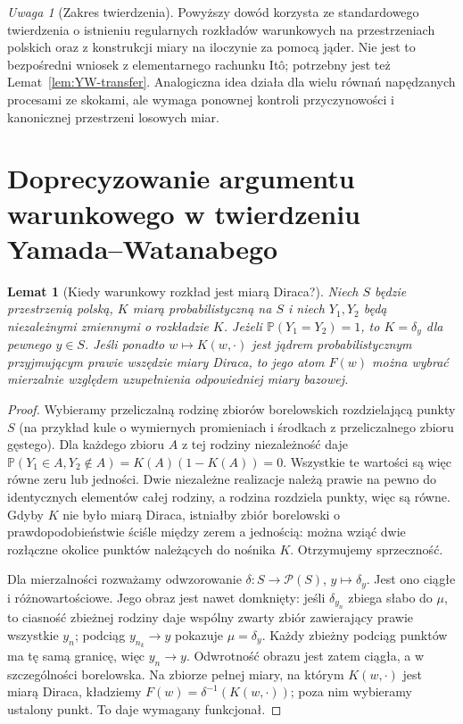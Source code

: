 \documentclass[11pt,a4paper,oneside]{report}
\numberwithin{equation}{chapter}
\theoremstyle{plain}
\newtheorem{lemat}[twierdzenie]{Lemat}
\theoremstyle{definition}
\theoremstyle{remark}
\newtheorem{uwaga}{Uwaga}[chapter]
\newcommand{\Prob}{\mathbb{P}}
\begin{document}
\begin{uwaga}[Zakres twierdzenia]
Powyższy dowód korzysta ze standardowego twierdzenia o
istnieniu regularnych rozkładów warunkowych na przestrzeniach
polskich oraz z konstrukcji miary na iloczynie za pomocą jąder.
Nie jest to bezpośredni wniosek z elementarnego rachunku
Itô; potrzebny jest też Lemat~\ref{lem:YW-transfer}.
Analogiczna idea działa dla wielu równań napędzanych
procesami ze skokami, ale wymaga ponownej kontroli
przyczynowości i kanonicznej przestrzeni losowych miar.
\end{uwaga}


\section{Doprecyzowanie argumentu warunkowego w twierdzeniu Yamada--Watanabego}

\begin{lemat}[Kiedy warunkowy rozkład jest miarą Diraca?]
\label{lem:dirac-audit}
Niech $S$ będzie przestrzenią polską, $K$ miarą
probabilistyczną na $S$ i niech $Y_1,Y_2$ będą
niezależnymi zmiennymi o rozkładzie $K$. Jeżeli
$\Prob(Y_1=Y_2)=1$, to $K=\delta_y$ dla pewnego $y\in S$.
Jeśli ponadto $w\mapsto K(w,\cdot)$ jest jądrem
probabilistycznym przyjmującym prawie wszędzie miary
Diraca, to jego atom $F(w)$ można wybrać mierzalnie
względem uzupełnienia odpowiedniej miary bazowej.
\end{lemat}
\begin{proof}
Wybieramy przeliczalną rodzinę zbiorów borelowskich
rozdzielającą punkty $S$ (na przykład kule o wymiernych
promieniach i środkach z przeliczalnego zbioru gęstego).
Dla każdego zbioru $A$ z tej rodziny niezależność daje
$\Prob(Y_1\in A,Y_2\notin A)=K(A)(1-K(A))=0$.
Wszystkie te wartości są więc równe zeru lub jedności.
Dwie niezależne realizacje należą prawie na pewno do
identycznych elementów całej rodziny, a rodzina rozdziela
punkty, więc są równe. Gdyby $K$ nie było miarą Diraca,
istniałby zbiór borelowski o prawdopodobieństwie ściśle
między zerem a jednością: można wziąć dwie rozłączne
okolice punktów należących do nośnika $K$.
Otrzymujemy sprzeczność.

Dla mierzalności rozważamy odwzorowanie
$\delta:S\to\mathcal P(S)$, $y\mapsto\delta_y$.
Jest ono ciągłe i różnowartościowe. Jego obraz jest
nawet domknięty: jeśli $\delta_{y_n}$ zbiega słabo do
$\mu$, to ciasność zbieżnej rodziny daje wspólny
zwarty zbiór zawierający prawie wszystkie $y_n$;
podciąg $y_{n_k}\to y$ pokazuje $\mu=\delta_y$.
Każdy zbieżny podciąg punktów ma tę samą granicę,
więc $y_n\to y$. Odwrotność obrazu jest zatem
ciągła, a w szczególności borelowska. Na zbiorze pełnej miary, na którym
$K(w,\cdot)$ jest miarą Diraca, kładziemy
$F(w)=\delta^{-1}(K(w,\cdot))$; poza nim wybieramy
ustalony punkt. To daje wymagany funkcjonał.
\end{proof}
\end{document}
